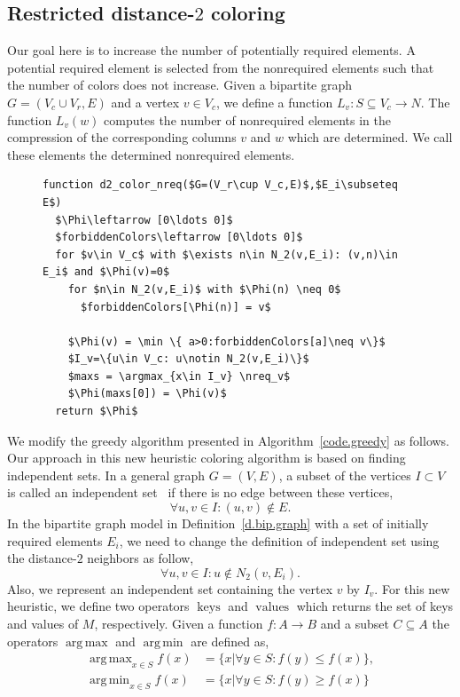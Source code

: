 \documentclass[12pt, twoside,a4paper,toc=bibliography]{scrbook}
\DeclareMathOperator*{\argmin}{arg\,min}
\DeclareMathOperator*{\argmax}{arg\,max}
\newcommand{\defref}[1]{Definition~\protect\ref{#1}}
\newcommand{\coderef}[1]{Algorithm~\protect\ref{#1}}
\newcommand{\nreq}{L}
\begin{document}
\subsection{Restricted distance-$2$ coloring}
Our goal here is to increase the number of potentially required elements.
A potential required element is selected from the nonrequired elements such that
the number of colors does not increase.
Given a bipartite graph $G=(V_c\cup V_r,E)$ and a vertex $v\in V_c$, 
we define a function $\nreq_v:S\subseteq V_c\rightarrow N$.
The function $\nreq_v(w)$ computes
the number of nonrequired elements in the compression of
the corresponding columns $v$ and $w$ which are determined.
We call these elements the determined nonrequired elements.
\begin{figure}
\begin{lstlisting}[caption=New coloring heuristic for distance-$2$ coloring
considering the nonrequired elements.,label=code.new.d2.nreq,mathescape]
function d2_color_nreq($G=(V_r\cup V_c,E)$,$E_i\subseteq E$)
  $\Phi\leftarrow [0\ldots 0]$
  $forbiddenColors\leftarrow [0\ldots 0]$
  for $v\in V_c$ with $\exists n\in N_2(v,E_i): (v,n)\in E_i$ and $\Phi(v)=0$
    for $n\in N_2(v,E_i)$ with $\Phi(n) \neq 0$
      $forbiddenColors[\Phi(n)] = v$

    $\Phi(v) = \min \{ a>0:forbiddenColors[a]\neq v\}$
    $I_v=\{u\in V_c: u\notin N_2(v,E_i)\}$
    $maxs = \argmax_{x\in I_v} \nreq_v$
    $\Phi(maxs[0]) = \Phi(v)$
  return $\Phi$
\end{lstlisting}
\end{figure}
We modify the greedy algorithm  presented in \coderef{code.greedy} as follows.
Our approach in this new heuristic coloring algorithm
is based on finding independent sets.
In a general graph $G=(V,E)$, a subset of the vertices $I\subset V$ is
called an independent set~\cite{bondy2008graph} 
if there is no edge between these vertices,
$$\forall u,v\in I: (u,v)\notin E.$$
In the bipartite graph model in \defref{d.bip.graph} with a set of initially required elements $E_i$,
we need to change the definition of independent set using the distance-$2$ neighbors as follow,
$$\forall u,v\in I: u\notin N_2(v,E_i).$$
Also, we represent an independent set containing the vertex $v$ by $I_v$.
For this new heuristic, we define two operators $\operatorname{keys}$ 
and $\operatorname{values}$ which returns the set of keys
and values of $M$, respectively.
Given a function $f:A\rightarrow B$ and a subset $C\subseteq A$
the operators $\argmax$ and $\argmin$ are defined as,
\begin{equation*}
\begin{split}
\argmax_{x\in S} f(x) &= \{ x | \forall y\in S: f(y) \leq f(x)\}, \\
\argmin_{x\in S} f(x) &= \{ x | \forall y\in S: f(y) \geq f(x)\}
\end{split}
\end{equation*}
\end{document}
